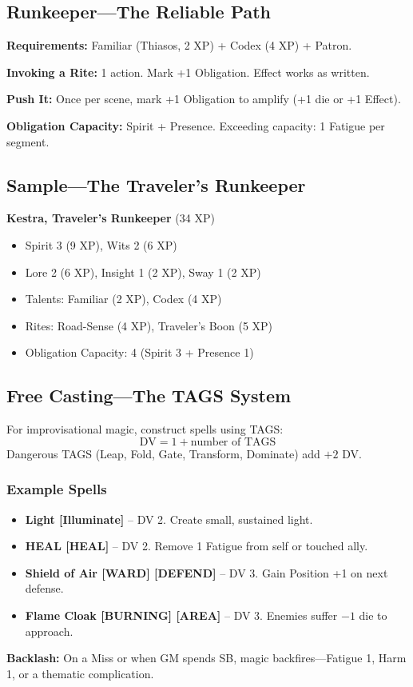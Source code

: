 \documentclass[10pt]{article}
\begin{document}
\subsection{Runkeeper—The Reliable Path}
\textbf{Requirements:} Familiar (Thiasos, 2 XP) + Codex (4 XP) + Patron.

\textbf{Invoking a Rite:} 1 action. Mark +1 Obligation. Effect works as written.

\textbf{Push It:} Once per scene, mark +1 Obligation to amplify (+1 die or +1 Effect).

\textbf{Obligation Capacity:} Spirit + Presence. Exceeding capacity: 1 Fatigue per segment.

\subsection{Sample—The Traveler's Runkeeper}
\begin{sidebar}
    \textbf{Kestra, Traveler's Runkeeper} (34 XP)
    \begin{itemize}[leftmargin=*]
        \item Spirit 3 (9 XP), Wits 2 (6 XP)
        \item Lore 2 (6 XP), Insight 1 (2 XP), Sway 1 (2 XP)
        \item Talents: Familiar (2 XP), Codex (4 XP)
        \item Rites: Road-Sense (4 XP), Traveler's Boon (5 XP)
        \item Obligation Capacity: 4 (Spirit 3 + Presence 1)
    \end{itemize}
\end{sidebar}

\subsection{Free Casting—The TAGS System}
For improvisational magic, construct spells using TAGS:
\[
\text{DV} = 1 + \text{number of TAGS}
\]
Dangerous TAGS (Leap, Fold, Gate, Transform, Dominate) add $+2$ DV.

\subsubsection{Example Spells}
\begin{itemize}[leftmargin=*]
    \item \textbf{Light [Illuminate]} – DV 2. Create small, sustained light.
    \item \textbf{HEAL [HEAL]} – DV 2. Remove 1 Fatigue from self or touched ally.
    \item \textbf{Shield of Air [WARD] [DEFEND]} – DV 3. Gain Position +1 on next defense.
    \item \textbf{Flame Cloak [BURNING] [AREA]} – DV 3. Enemies suffer $-1$ die to approach.
\end{itemize}
\textbf{Backlash:} On a Miss or when GM spends SB, magic backfires—Fatigue 1, Harm 1, or a thematic complication.
\end{document}
